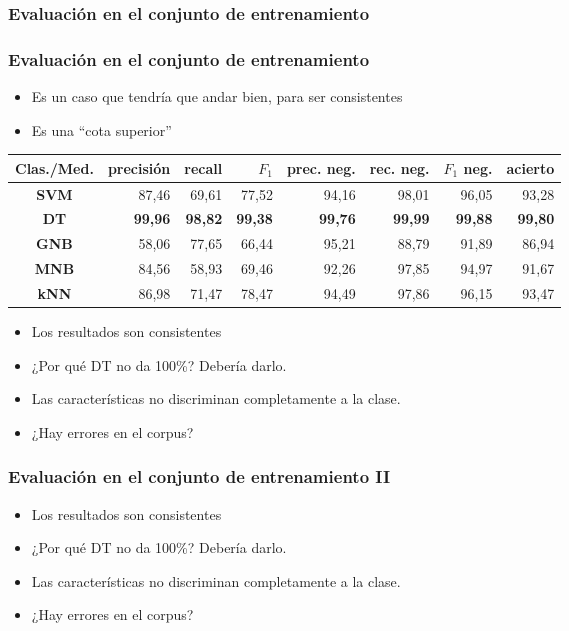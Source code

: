 \subsubsection{Evaluación en el conjunto de entrenamiento}
\begin{frame}
    \frametitle{Evaluación en el conjunto de entrenamiento}

    \begin{itemize}
        \item Es un caso que tendría que andar bien, para ser consistentes
        \item Es una ``cota superior''
    \end{itemize}

    \begin{center}
        \scriptsize
        \begin{tabular}{ c | r | r | r | r | r | r | r }
            \textbf{Clas./Med.} & precisión & recall & $F_1$ & prec. neg. & rec. neg. & $F_1$ neg. & acierto \\
            \hline
            \textbf{SVM} & 87,46 & 69,61 & 77,52 & 94,16 & 98,01 & 96,05 & 93,28\\
            \hline
            \textbf{DT} & \textbf{99,96} & \textbf{98,82} & \textbf{99,38} & \textbf{99,76} & \textbf{99,99} & \textbf{99,88} & \textbf{99,80} \\
            \hline
            \textbf{GNB} & 58,06 & 77,65 & 66,44 & 95,21 & 88,79 & 91,89 & 86,94 \\
            \hline
            \textbf{MNB} & 84,56 & 58,93 & 69,46 & 92,26 & 97,85 & 94,97 & 91,67 \\
            \hline
            \textbf{kNN} & 86,98 & 71,47 & 78,47 & 94,49 & 97,86 & 96,15 & 93,47 \\
        \end{tabular}
    \end{center}

    \begin{itemize}[<+->]
        \item Los resultados son consistentes
        \item ¿Por qué DT no da 100\%? Debería darlo.
        \item Las características no discriminan completamente a la clase.
        \item ¿Hay errores en el corpus?
    \end{itemize}
\end{frame}

\begin{frame}
    \frametitle{Evaluación en el conjunto de entrenamiento II}

    \begin{itemize}[<+->]
        \item Los resultados son consistentes
        \item ¿Por qué DT no da 100\%? Debería darlo.
        \item Las características no discriminan completamente a la clase.
        \item ¿Hay errores en el corpus?
    \end{itemize}
\end{frame}

